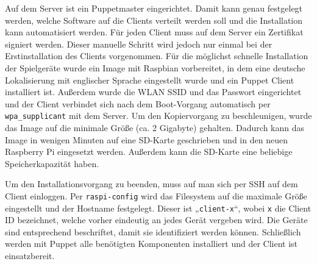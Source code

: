 Auf dem Server ist ein Puppetmaster eingerichtet.
Damit kann genau festgelegt werden, welche Software auf die Clients verteilt werden soll und die
Installation kann automatisiert werden.
Für jeden Client muss auf dem Server ein Zertifikat signiert werden.
Dieser manuelle Schritt wird jedoch nur einmal bei der Erstinstallation des Clients vorgenommen.
Für die möglichst schnelle Installation der Spielgeräte wurde ein Image mit Raspbian vorbereitet, in
dem eine deutsche Lokalisierung mit englischer Sprache eingestellt wurde und ein Puppet Client
installiert ist.
Außerdem wurde die WLAN SSID und das Passwort eingerichtet und der Client verbindet sich nach dem
Boot-Vorgang automatisch per \texttt{wpa\_supplicant} mit dem Server.
Um den Kopiervorgang zu beschleunigen, wurde das Image auf die minimale Größe (ca. 2 Gigabyte)
gehalten.
Dadurch kann das Image in wenigen Minuten auf eine SD-Karte geschrieben und in den neuen Raspberry
Pi eingesetzt werden.
Außerdem kann die SD-Karte eine beliebige Speicherkapazität haben.

Um den Installationsvorgang zu beenden, muss auf man sich per SSH auf dem Client einloggen.
Per \texttt{raspi-config} wird das Filesystem auf die maximale Größe eingestellt und der Hostname
festgelegt.
Dieser ist „\texttt{client-x}“, wobei \texttt{x} die Client ID bezeichnet, welche vorher eindeutig
an jedes Gerät vergeben wird.
Die Geräte sind entsprechend beschriftet, damit sie identifiziert werden können.
Schließlich werden mit Puppet alle benötigten Komponenten installiert und der Client ist
einsatzbereit.

